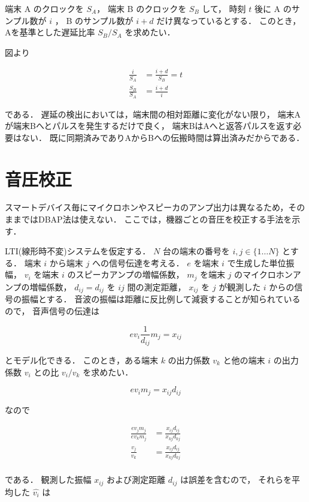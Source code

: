 端末 A のクロックを $S_A$，
端末 B のクロックを $S_B$ して，
時刻 $t$ 後に
A のサンプル数が $i$ ，
B のサンプル数が $i+d$ だけ異なっているとする．
このとき，Aを基準とした遅延比率 $S_B/S_A$ を求めたい．


図より

$$\begin{aligned}
\frac{i}{S_A} &= \frac{i+d}{S_B} = t \\
\frac{S_B}{S_A} &= \frac{i+d}{i}
\end{aligned}$$

である．
遅延の検出においては，端末間の相対距離に変化がない限り，
端末Aが端末Bへとパルスを発生するだけで良く，
端末BはAへと返答パルスを返す必要はない．
既に同期済みでありAからBへの伝搬時間は算出済みだからである．

\section{音圧校正}
スマートデバイス毎にマイクロホンやスピーカのアンプ出力は異なるため，そのままではDBAP法は使えない．
ここでは，機器ごとの音圧を校正する手法を示す．

LTI(線形時不変)システムを仮定する．
$N$ 台の端末の番号を $i,j \in \{1\dots N\}$ とする．
端末 $i$ から端末 $j$ への信号伝達を考える．
$e$ を端末 $i$ で生成した単位振幅，
$v_i$ を端末 $i$ のスピーカアンプの増幅係数，
$m_j$ を端末 $j$ のマイクロホンアンプの増幅係数，
$d_{ij}=d_{ij}$ を $ij$ 間の測定距離，
$x_{ij}$ を $j$ が観測した $i$ からの信号の振幅とする．
音波の振幅は距離に反比例して減衰することが知られているので，
音声信号の伝達は


$$
e v_i \frac{1}{d_{ij}} m_j = x_{ij}
$$

とモデル化できる．
このとき，ある端末 $k$ の出力係数 $v_k$ と他の端末 $i$ の出力係数 $v_i$ との比 $v_i/v_k$ を求めたい．

$$
e v_i m_j = x_{ij}d_{ij}
$$

なので

$$\begin{aligned}
\frac{e v_j m_j}{e v_k m_j} &= \frac{x_{ij} d_{ij}}{x_{kj} d_{kj}} \\
\frac{v_j}{v_k} &= \frac{x_{ij} d_{ij}}{x_{kj}d_{kj}} \\
\end{aligned}$$

である．
観測した振幅 $x_{ij}$ および測定距離 $d_{ij}$ は誤差を含むので，
それらを平均した $\hat{v_i}$ は

